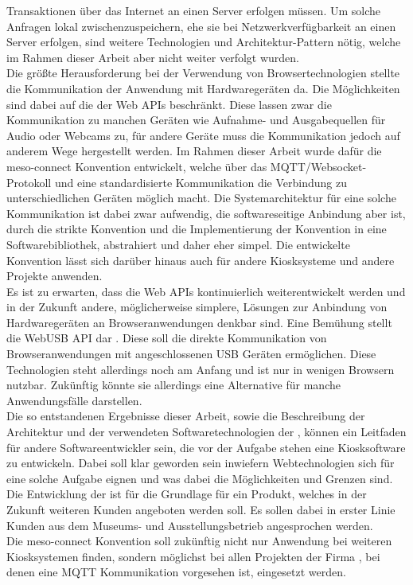 Transaktionen über das Internet an einen Server erfolgen müssen. Um solche Anfragen lokal zwischenzuspeichern,
ehe sie bei Netzwerkverfügbarkeit an einen Server erfolgen, sind weitere Technologien und 
Architektur-Pattern nötig, welche im Rahmen dieser Arbeit aber nicht weiter verfolgt wurden.\\
Die größte Herausforderung bei der Verwendung von Browsertechnologien stellte die Kommunikation 
der Anwendung mit Hardwaregeräten da. 
Die Möglichkeiten sind dabei auf die der Web APIs beschränkt. Diese lassen zwar die Kommunikation zu manchen
Geräten wie Aufnahme- und Ausgabequellen für Audio oder Webcams zu, für andere Geräte muss die Kommunikation
jedoch auf anderem Wege hergestellt werden. Im Rahmen dieser Arbeit wurde dafür die meso-connect Konvention 
entwickelt, welche über das MQTT/Websocket-Protokoll und eine standardisierte Kommunikation die Verbindung
zu unterschiedlichen Geräten möglich macht. Die Systemarchitektur für eine solche Kommunikation ist dabei zwar
aufwendig, die softwareseitige Anbindung aber ist, durch die strikte Konvention und die Implementierung der Konvention
in eine Softwarebibliothek, abstrahiert und daher eher simpel. Die entwickelte Konvention lässt sich darüber 
hinaus auch für andere Kiosksysteme und andere Projekte anwenden.\\
Es ist zu erwarten, dass die Web APIs kontinuierlich weiterentwickelt werden und in der Zukunft andere,
möglicherweise simplere, Lösungen zur Anbindung von Hardwaregeräten an Browseranwendungen denkbar sind. Eine Bemühung
stellt die WebUSB API dar \cite{web-usb}. Diese soll die direkte Kommunikation von Browseranwendungen mit angeschlossenen
USB Geräten ermöglichen. Diese Technologien steht allerdings noch am Anfang und ist nur in wenigen Browsern 
nutzbar. Zukünftig könnte sie allerdings eine Alternative für manche Anwendungsfälle darstellen.\\

Die so entstandenen Ergebnisse dieser Arbeit, sowie die Beschreibung der Architektur und der verwendeten
Softwaretechnologien der \shst{}, können ein Leitfaden für andere Softwareentwickler sein, die 
vor der Aufgabe stehen eine Kiosksoftware zu entwickeln. Dabei soll klar geworden sein inwiefern 
Webtechnologien sich für eine solche Aufgabe eignen und was dabei die Möglichkeiten und Grenzen sind.\\
Die Entwicklung der \shst{} ist für \meso{} die Grundlage für ein Produkt, 
welches in der Zukunft weiteren Kunden angeboten werden soll. Es sollen dabei in erster Linie Kunden 
aus dem Museums- und Ausstellungsbetrieb angesprochen werden.\\
Die meso-connect Konvention soll zukünftig nicht nur Anwendung bei weiteren Kiosksystemen finden, sondern 
möglichst bei allen Projekten der Firma \meso{}, bei denen eine MQTT Kommunikation vorgesehen ist, eingesetzt
werden.
